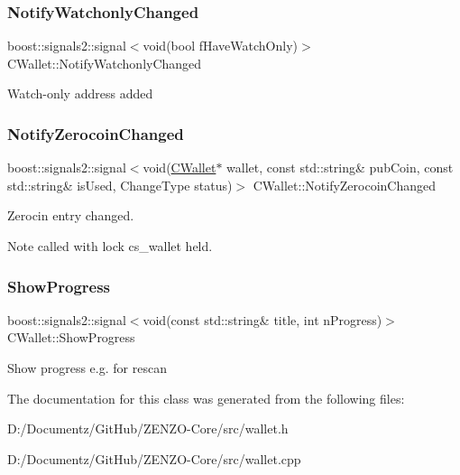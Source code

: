 \subsubsection{\texorpdfstring{NotifyWatchonlyChanged}{NotifyWatchonlyChanged}}
{\footnotesize\ttfamily boost\+::signals2\+::signal$<$void(bool f\+Have\+Watch\+Only)$>$ C\+Wallet\+::\+Notify\+Watchonly\+Changed}

Watch-\/only address added \mbox{\label{class_c_wallet_a30f82cd0f9feac86cd2b64999be7f9d7}} 
\subsubsection{\texorpdfstring{NotifyZerocoinChanged}{NotifyZerocoinChanged}}
{\footnotesize\ttfamily boost\+::signals2\+::signal$<$void(\mbox{\hyperlink{class_c_wallet}{C\+Wallet}}$\ast$ wallet, const std\+::string\& pub\+Coin, const std\+::string\& is\+Used, Change\+Type status)$>$ C\+Wallet\+::\+Notify\+Zerocoin\+Changed}

Zerocin entry changed. \begin{DoxyNote}{Note}
called with lock cs\+\_\+wallet held. 
\end{DoxyNote}
\mbox{\label{class_c_wallet_afa895ec96ad91fff551b4b9daf6ad4a6}} 
\subsubsection{\texorpdfstring{ShowProgress}{ShowProgress}}
{\footnotesize\ttfamily boost\+::signals2\+::signal$<$void(const std\+::string\& title, int n\+Progress)$>$ C\+Wallet\+::\+Show\+Progress}

Show progress e.\+g. for rescan 

The documentation for this class was generated from the following files\+:\begin{DoxyCompactItemize}
\item 
D\+:/\+Documentz/\+Git\+Hub/\+Z\+E\+N\+Z\+O-\/\+Core/src/wallet.\+h\item 
D\+:/\+Documentz/\+Git\+Hub/\+Z\+E\+N\+Z\+O-\/\+Core/src/wallet.\+cpp\end{DoxyCompactItemize}
